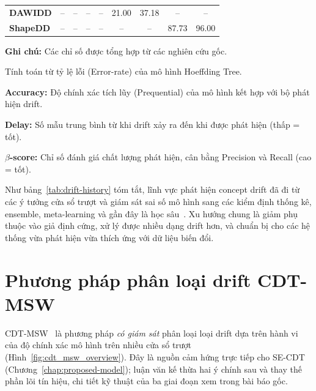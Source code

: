 \begin{table}[!htbp]
\begin{threeparttable}
\begin{tabular}{@{}lcccccccc@{}}
			\textbf{DAWIDD}                      & --                                         & --                                 & --                                         & --           & 21.00          & 37.18         & --             & --            \\
			\textbf{ShapeDD}                     & --                                         & --                                 & --                                         & --           & --             & --            & 87.73          & 96.00         \\
			\bottomrule
		\end{tabular}
		\begin{tablenotes}
			\footnotesize
			\item \textbf{Ghi chú:} Các chỉ số được tổng hợp từ các nghiên cứu gốc.
			\item[$\dagger$] Tính toán từ tỷ lệ lỗi (Error-rate) của mô hình Hoeffding Tree.
			\item \textbf{Accuracy:} Độ chính xác tích lũy (Prequential) của mô hình kết hợp với bộ phát hiện drift.
			\item \textbf{Delay:} Số mẫu trung bình từ khi drift xảy ra đến khi được phát hiện (thấp = tốt).
			\item \textbf{$\beta$-score:} Chỉ số đánh giá chất lượng phát hiện, cân bằng Precision và Recall (cao = tốt).
		\end{tablenotes}
	\end{threeparttable}
\end{table}

Như bảng~\ref{tab:drift-history} tóm tắt, lĩnh vực phát hiện concept drift đã đi từ các ý tưởng cửa sổ trượt và giám sát sai số mô hình sang các kiểm định thống kê, ensemble, meta-learning và gần đây là học sâu~\cite{hovakimyan2024evolving}. Xu hướng chung là giảm phụ thuộc vào giả định cứng, xử lý được nhiều dạng drift hơn, và chuẩn bị cho các hệ thống vừa phát hiện vừa thích ứng với dữ liệu biến đổi.

\section{Phương pháp phân loại drift CDT-MSW}
\label{sec:cdt-msw-theory}

CDT-MSW~\cite{guo2022cdtmsw} là phương pháp \emph{có giám sát} phân loại loại drift dựa trên hành vi của độ chính xác mô hình trên nhiều cửa sổ trượt (Hình~\ref{fig:cdt_msw_overview}). Đây là nguồn cảm hứng trực tiếp cho SE-CDT (Chương~\ref{chap:proposed-model}); luận văn kế thừa hai ý chính sau và thay thế phần lõi tín hiệu, chi tiết kỹ thuật của ba giai đoạn xem trong bài báo gốc.

